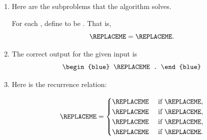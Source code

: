 \begin{enumerate}[label=(\alph*)]

\item 


  Here are the subproblems that the algorithm solves.
  
  \begin{blue}
    For each
    \REPLACEME,
    define
    \REPLACEME
    to be
    \REPLACEME.                 %
    That is, 
    \[\REPLACEME = \REPLACEME.\] %
  \end{blue}

\item


  The correct output for the given input is
  \[
    \begin{blue}
      \REPLACEME.
    \end{blue}
  \]

\item


  Here is the recurrence relation:

  \begin{blue}
    \[
      \REPLACEME =
      \begin{cases}
        \REPLACEME & \text{ if } \REPLACEME, \\
        \REPLACEME & \text{ if } \REPLACEME, \\
        \REPLACEME & \text{ if } \REPLACEME, \\
        \REPLACEME & \text{ if } \REPLACEME. \\
      \end{cases}
    \]
  \end{blue}


\end{enumerate}

